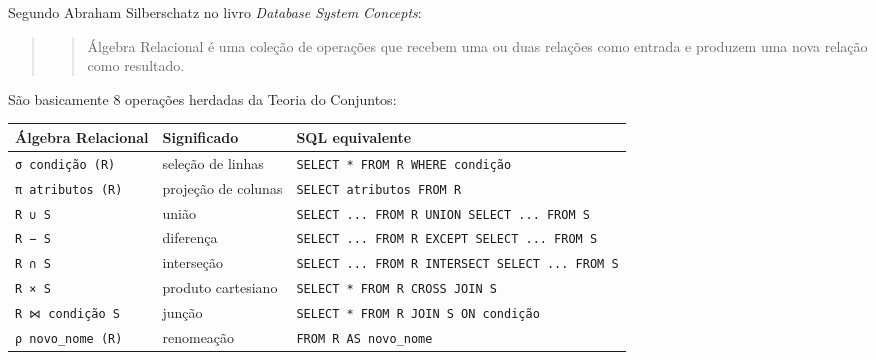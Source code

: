 \documentclass[
]{book}
\begin{document}
Segundo Abraham Silberschatz no livro \emph{Database System Concepts}:

\begin{quote}
\begin{quote}
Álgebra Relacional é uma coleção de operações que recebem uma ou duas relações como entrada e produzem uma nova relação como resultado.
\end{quote}
\end{quote}

São basicamente 8 operações herdadas da Teoria do Conjuntos:

\begin{longtable}[]{@{}
  >{\raggedright\arraybackslash}p{}
  >{\raggedright\arraybackslash}p{}
  >{\raggedright\arraybackslash}p{}@{}}
\toprule\noalign{}
\begin{minipage}[b]{\linewidth}\raggedright
Álgebra Relacional
\end{minipage} & \begin{minipage}[b]{\linewidth}\raggedright
Significado
\end{minipage} & \begin{minipage}[b]{\linewidth}\raggedright
SQL equivalente
\end{minipage} \\
\midrule\noalign{}
\endhead
\bottomrule\noalign{}
\endlastfoot
\texttt{σ\ condição\ (R)} & seleção de linhas & \texttt{SELECT\ *\ FROM\ R\ WHERE\ condição} \\
\texttt{π\ atributos\ (R)} & projeção de colunas & \texttt{SELECT\ atributos\ FROM\ R} \\
\texttt{R\ ∪\ S} & união & \texttt{SELECT\ ...\ FROM\ R\ UNION\ SELECT\ ...\ FROM\ S} \\
\texttt{R\ −\ S} & diferença & \texttt{SELECT\ ...\ FROM\ R\ EXCEPT\ SELECT\ ...\ FROM\ S} \\
\texttt{R\ ∩\ S} & interseção & \texttt{SELECT\ ...\ FROM\ R\ INTERSECT\ SELECT\ ...\ FROM\ S} \\
\texttt{R\ ×\ S} & produto cartesiano & \texttt{SELECT\ *\ FROM\ R\ CROSS\ JOIN\ S} \\
\texttt{R\ ⋈\ condição\ S} & junção & \texttt{SELECT\ *\ FROM\ R\ JOIN\ S\ ON\ condição} \\
\texttt{ρ\ novo\_nome\ (R)} & renomeação & \texttt{FROM\ R\ AS\ novo\_nome} \\
\end{longtable}
\end{document}
